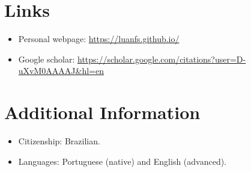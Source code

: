 \documentclass[letterpaper,11pt]{article}
\begin{document}
%
\section{Links}
\begin{itemize}
	\item Personal webpage:  \href{https://luanfs.github.io/}{https://luanfs.github.io/}
	\item Google scholar: \href{https://scholar.google.com/citations?user=D-uXvM0AAAAJ&hl=en}{https://scholar.google.com/citations?user=D-uXvM0AAAAJ\&hl=en}
\end{itemize}


\section{Additional Information}
\begin{itemize}
	\item Citizenship: Brazilian.
	\item Languages: Portuguese (native) and English (advanced).
\end{itemize}




\end{document}
